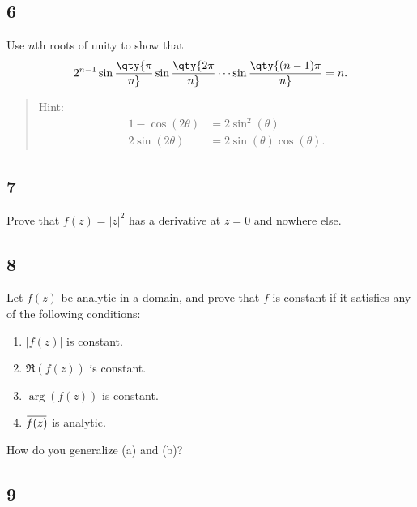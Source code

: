 \hypertarget{section-26}{%
\subsection{6}\label{section-26}}

Use \(n\)th roots of unity to show that
\begin{align*}
2^{n-1} \sin\qty{\pi \over n} \sin\qty{2\pi \over n} \cdots \sin\qty{(n-1)\pi \over n} = n
.\end{align*}

\begin{quote}
Hint:
\begin{align*}
1 - \cos(2\theta) &= 2\sin^2(\theta) \\
2 \sin(2\theta) &= 2\sin(\theta) \cos(\theta)
.\end{align*}
\end{quote}

\hypertarget{section-27}{%
\subsection{7}\label{section-27}}

Prove that \(f(z) = {\left\lvert {z} \right\rvert}^2\) has a derivative
at \(z=0\) and nowhere else.

\hypertarget{section-28}{%
\subsection{8}\label{section-28}}

Let \(f(z)\) be analytic in a domain, and prove that \(f\) is constant
if it satisfies any of the following conditions:

\begin{enumerate}
\def\labelenumi{\alph{enumi}.}
\tightlist
\item
  \({\left\lvert {f(z)} \right\rvert}\) is constant.
\item
  \(\Re(f(z))\) is constant.
\item
  \(\arg(f(z))\) is constant.
\item
  \(\mkern 1.5mu\overline{\mkern-1.5muf(z)\mkern-1.5mu}\mkern 1.5mu\) is
  analytic.
\end{enumerate}

How do you generalize (a) and (b)?

\hypertarget{section-29}{%
\subsection{9}\label{section-29}}

